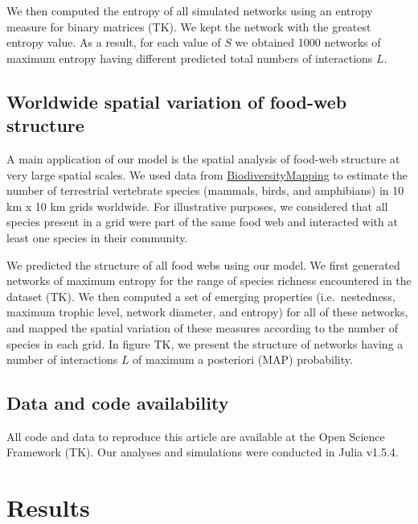 \documentclass[10pt,oneside]{article}
\begin{document}
We then computed the entropy of all simulated networks using an entropy
measure for binary matrices (TK). We kept the network with the greatest
entropy value. As a result, for each value of \(S\) we obtained 1000
networks of maximum entropy having different predicted total numbers of
interactions \(L\).

\hypertarget{worldwide-spatial-variation-of-food-web-structure}{%
\subsection{Worldwide spatial variation of food-web
structure}\label{worldwide-spatial-variation-of-food-web-structure}}

A main application of our model is the spatial analysis of food-web
structure at very large spatial scales. We used data from
\href{https://biodiversitymapping.org/}{BiodiversityMapping} to estimate
the number of terrestrial vertebrate species (mammals, birds, and
amphibians) in 10 km x 10 km grids worldwide. For illustrative purposes,
we considered that all species present in a grid were part of the same
food web and interacted with at least one species in their community.

We predicted the structure of all food webs using our model. We first
generated networks of maximum entropy for the range of species richness
encountered in the dataset (TK). We then computed a set of emerging
properties (i.e.~nestedness, maximum trophic level, network diameter,
and entropy) for all of these networks, and mapped the spatial variation
of these measures according to the number of species in each grid. In
figure TK, we present the structure of networks having a number of
interactions \(L\) of maximum a posteriori (MAP) probability.

\hypertarget{data-and-code-availability}{%
\subsection{Data and code
availability}\label{data-and-code-availability}}

All code and data to reproduce this article are available at the Open
Science Framework (TK). Our analyses and simulations were conducted in
Julia v1.5.4.

\hypertarget{results}{%
\section{Results}\label{results}}
\end{document}
